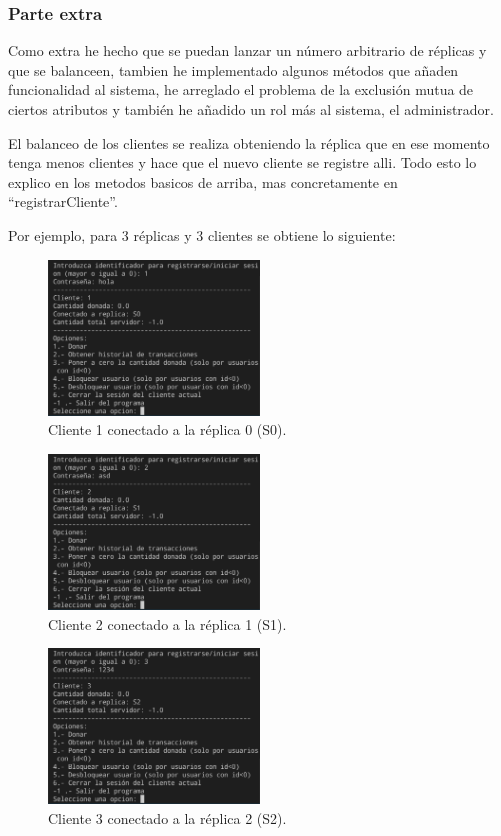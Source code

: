 \documentclass{article}
\begin{document}
\subsubsection{Parte extra}
Como extra he hecho que se puedan lanzar un número arbitrario de réplicas y que se balanceen, tambien he implementado algunos métodos que añaden funcionalidad al sistema, he arreglado el problema de la exclusión mutua de ciertos atributos y también he añadido un rol más al sistema, el administrador. 

El balanceo de los clientes se realiza obteniendo la réplica que en ese momento tenga menos clientes y hace que el nuevo cliente se registre alli. Todo esto lo explico en los metodos basicos de arriba, mas concretamente en ``registrarCliente''.

Por ejemplo, para 3 réplicas y 3 clientes se obtiene lo siguiente:
\begin{figure}[H]
    \centering
    \includegraphics[width=0.5\textwidth]{imagenes/3replicasS0.png}
    \caption{Cliente 1 conectado a la réplica 0 (S0).}
\end{figure}

\begin{figure}[H]
    \centering
    \includegraphics[width=0.5\textwidth]{imagenes/3replicasS1.png}
    \caption{Cliente 2 conectado a la réplica 1 (S1).}
\end{figure}

\begin{figure}[H]
    \centering
    \includegraphics[width=0.5\textwidth]{imagenes/3replicasS2.png}
    \caption{Cliente 3 conectado a la réplica 2 (S2).}
\end{figure}
\end{document}
